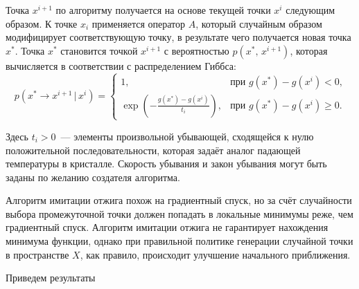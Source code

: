 Точка $x^{i+1}$ по алгоритму получается на основе текущей точки $x^i$ следующим образом. К точке $x_i$ применяется оператор $A$, который случайным образом модифицирует соответствующую точку, в результате чего получается новая точка $x^*$. Точка $x^*$ становится точкой $x^{i+1}$ с вероятностью $p(x^*,\,x^{i+1})$, которая вычисляется в соответствии с распределением Гиббса:
$$
        p(x^*\to x^{i+1}\,|\,x^i)
=
        \begin{cases}
1,
        &
\mbox{при $g(x^*) - g(x^i) < 0$,}
        \\
\exp\left(-\frac{g(x^*) - g(x^i)}{t_i}\right),
        &
\mbox{при $g(x^*) - g(x^i) \geqslant 0$}.
\end{cases}
$$

Здесь $t_i>0$~--- элементы произвольной убывающей, сходящейся к нулю положительной последовательности, которая задаёт аналог падающей температуры в кристалле. Скорость убывания и закон убывания могут быть заданы по желанию создателя алгоритма.

Алгоритм имитации отжига похож на градиентный спуск, но за счёт случайности выбора промежуточной точки должен попадать в локальные минимумы реже, чем градиентный спуск. Алгоритм имитации отжига не гарантирует нахождения минимума функции, однако при правильной политике генерации случайной точки в пространстве $X$, как правило, происходит улучшение начального приближения.

Приведем результаты 


